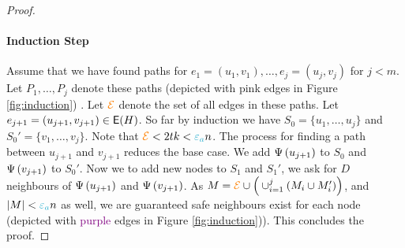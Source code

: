 \documentclass[11pt]{article}
\begin{document}
\begin{proof}
\paragraph{Induction Step}
	
Assume that we have found paths for $e_1 = (u_1, v_1), \dots, e_j=(u_j, v_j)$ for $j < m$.
Let $P_1, \dots, P_j$ denote these paths (depicted with \textcolor{carminepink}{pink} edges in Figure \ref{fig:induction}) .
Let $\textcolor{orange}{\mathcal{E}}$ denote the set of all edges in these paths.
Let $e_{j+1} = (u_{j+1},v_{j+1}) \in \mathsf{E}(H)$.
So far by induction we have $S_0 = \{u_1, \dots, u_j\}$ and $S_0' = \{v_1, \dots, v_j\}$.
Note that $\GlobalEdgeSet <  2tk < \epsilonA n$.
The process for finding a path between $u_{j+1}$ and $v_{j+1}$ reduces the base case.
We add $\Psi\left(u_{j+1}\right)$ to $S_0$ and $\Psi\left(v_{j+1}\right)$ to $S_0'$.
Now we to add new nodes to $S_{1}$ and $S_{1}'$, we ask for $D$ neighbours of $\Psi\left(u_{j+1}\right)$ and $\Psi\left(v_{j+1}\right)$. As $M = \textcolor{orange}{\mathcal{E}} \cup \Big(\cup_{i=1}^{j} (M_i \cup M'_i)\Big)$, and $|M| < \epsilonA n$ as well, we are guaranteed safe neighbours exist for each node (depicted with \textcolor{purple}{purple} edges in Figure \ref{fig:induction})).
This concludes the proof.


\end{proof}
\end{document}
